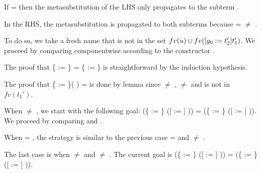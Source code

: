 \begin{coqdoccode}
\end{coqdoccode}
If  =  then the metasubstitution of the LHS only propagates to the subterm .\begin{coqdoccode}
 \end{coqdoccode}
In the RHS, the metasubstitution is propagated to both subterms because  =  \ensuremath{\not=} .\begin{coqdoccode}
 \end{coqdoccode}
To do so, we take a fresh name  that is not in the set $fv(u) \cup fv(\esub{t_1'}{y_0}{t_2'})$. We proceed by comparing componentwise according to the constructor .\begin{coqdoccode}
 \end{coqdoccode}
The proof that \{ := \} = \{ := \} is straightforward by the induction hypothesis.
\begin{coqdoccode}
\end{coqdoccode}
The proof that \{ := \}(   ) =     is done by lemma  since  \ensuremath{\not=} ,  \ensuremath{\not=}  and  is not in $fv(t_1')$.
\begin{coqdoccode}
\end{coqdoccode}
When  \ensuremath{\not=} , we start with the following goal: (\{ := \} ([ := ] )) = (\{ := \} ([ := ] )). We proceed by comparing  and .\begin{coqdoccode}
 \end{coqdoccode}
When  = , the strategy is similar to the previous case  =  and  \ensuremath{\not=} .\begin{coqdoccode}
 \end{coqdoccode}
The last case is when  \ensuremath{\not=}  and  \ensuremath{\not=} . The current goal is (\{ := \} ([ := ] )) = (\{ := \} ([ := ] )).\begin{coqdoccode}
 \end{coqdoccode}
